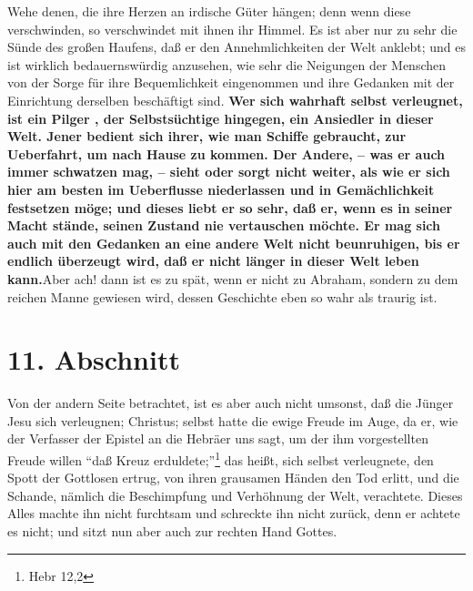 Wehe denen, die ihre Herzen an irdische Güter hängen; denn wenn diese
verschwinden, so verschwindet mit ihnen ihr Himmel. Es ist aber nur zu sehr die
Sünde des großen Haufens, daß er den Annehmlichkeiten der Welt anklebt; und es
ist wirklich bedauernswürdig anzusehen, wie sehr die Neigungen der Menschen von
der Sorge für ihre Bequemlichkeit eingenommen und ihre Gedanken mit der
Einrichtung derselben beschäftigt sind. \textbf{Wer sich wahrhaft selbst verleugnet, ist
ein Pilger , der Selbstsüchtige hingegen, ein Ansiedler in dieser Welt. Jener
bedient sich ihrer, wie man Schiffe gebraucht, zur Ueberfahrt, um nach Hause zu
kommen. Der Andere, -- was er auch immer schwatzen mag, -- sieht oder sorgt
nicht weiter, als wie er sich hier am besten im Ueberflusse niederlassen und in
Gemächlichkeit festsetzen möge; und dieses liebt er so sehr, daß er, wenn es in
seiner Macht stände, seinen Zustand nie vertauschen möchte. Er mag sich auch mit
den Gedanken an eine andere Welt nicht beunruhigen, bis er endlich überzeugt
wird, daß er nicht länger in dieser Welt leben kann.}Aber ach! dann ist es zu
spät, wenn er nicht zu Abraham, sondern zu dem reichen Manne gewiesen wird,
dessen Geschichte eben so wahr als traurig ist.

\section{11. Abschnitt} \label{kap4_ab11}

Von der andern Seite betrachtet, ist es aber auch nicht umsonst, daß die Jünger
Jesu sich verleugnen; Christus; selbst hatte die ewige Freude im Auge, da er,
wie der Verfasser der Epistel an die Hebräer uns sagt, um der ihm vorgestellten
Freude willen "`daß Kreuz erduldete;"'\footnote{Hebr 12,2} das heißt, sich
selbst verleugnete, den Spott der Gottlosen ertrug, von ihren grausamen Händen
den Tod erlitt, und die Schande, nämlich die Beschimpfung und Verhöhnung der
Welt, verachtete. Dieses Alles machte ihn nicht furchtsam und schreckte ihn
nicht zurück, denn er achtete es nicht; und sitzt nun aber auch zur rechten Hand
Gottes.

\medskip

